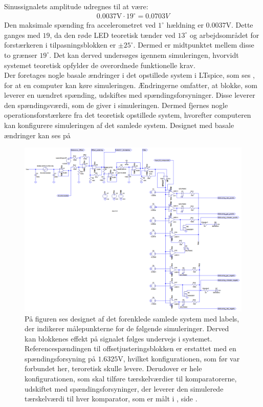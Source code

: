 \noindent Sinussignalets amplitude udregnes til at være:
\begin{eqnarray}
0.0037\text{V} \cdot 19^{\circ} = 0.0703V
\end{eqnarray}
\noindent Den maksimale spænding fra accelerometret ved $1^{\circ}$ hældning er $0.0037$V. Dette ganges med $19$, da den røde LED teoretisk tænder ved $13^{\circ}$ og arbejdsområdet for forstærkeren i tilpasningsblokken er $\pm25^{\circ}$. Dermed er midtpunktet mellem disse to grænser $19^{\circ}$. Det kan derved undersøges igennem simuleringen, hvorvidt systemet teoretisk opfylder de overordnede funktionelle krav.\\
Der foretages nogle basale ændringer i det opstillede system i LTspice, som ses , for at en computer kan køre simuleringen. Ændringerne omfatter, at blokke, som leverer en uændret spænding, udskiftes med spændingsforsyninger. Disse leverer den spændingsværdi, som de giver i simuleringen. Dermed fjernes nogle operationsforstærkere fra det teoretisk opstillede system, hvorefter computeren kan konfigurere simuleringen af det samlede system. Designet med basale ændringer kan ses på 
\begin{figure}[H]
	\centering
	\includegraphics[scale=.42]{figures/cProblemloesning/Samlet_system2_sim.PNG}
	\caption{På figuren ses designet af det forenklede samlede system med labels, der indikerer målepunkterne for de følgende simuleringer. Derved kan blokkenes effekt på signalet følges undervejs i systemet. Referencespændingen til offsetjusteringsblokken er erstattet med en spændingsforsyning på $1.6325$V, hvilket konfigurationen, som før var forbundet her, teroretisk skulle levere. Derudover er hele konfigurationen, som skal tilføre tærskelværdier til komparatorerne, udskiftet med spændingsforsyninger, der leverer den simulerede tærskelværdi til hver komparator, som er målt i , side \pageref{Tab:test_reference1}.}
	\label{fig:samlet_system}
\end{figure}
